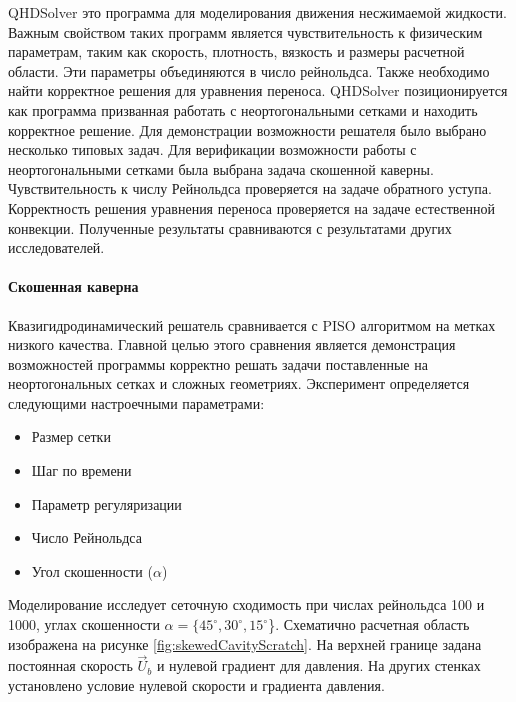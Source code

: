 QHDSolver это программа для моделирования движения несжимаемой жидкости. Важным свойством таких программ является чувствительность к физическим параметрам, таким как скорость, плотность, вязкость и размеры расчетной области. Эти параметры объединяются в число рейнольдса. Также необходимо найти корректное решения для уравнения переноса. QHDSolver позиционируется как программа призванная работать с неортогональными сетками и находить корректное решение. Для демонстрации возможности решателя было выбрано несколько типовых задач. Для верификации возможности работы с неортогональными сетками была выбрана задача скошенной каверны. Чувствительность к числу Рейнольдса проверяется на задаче обратного уступа. Корректность решения уравнения переноса проверяется на задаче естественной конвекции. Полученные результаты сравниваются с результатами других исследователей.

\paragraph{Скошенная каверна}

Квазигидродинамический решатель сравнивается с PISO алгоритмом на метках низкого качества. Главной целью этого сравнения является демонстрация возможностей программы корректно решать задачи поставленные на неортогональных сетках и сложных геометриях. Эксперимент определяется следующими настроечными параметрами:

\begin{itemize}
    \item Размер сетки
    \item Шаг по времени
    \item Параметр регуляризации
    \item Число Рейнольдса
    \item Угол скошенности ($\alpha$)
\end{itemize}

Моделирование исследует сеточную сходимость при числах рейнольдса 100 и 1000, углах скошенности $\alpha = \{45^{\circ}, 30^{\circ}, 15^{\circ}$\}. Схематично расчетная область изображена на рисунке \ref{fig:skewedCavityScratch}. На верхней границе задана постоянная скорость $\vec{U}_b$ и нулевой градиент для давления. На других стенках установлено условие нулевой скорости и градиента давления.


